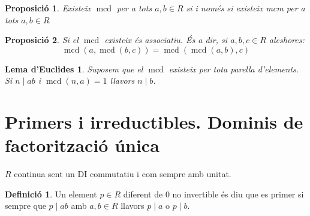 \documentclass[a4paper,11pt]{report}
\DeclareMathOperator{\mcd}{mcd}
\theoremstyle{theorem}
\newtheorem{proposicio}{\normalfont \sffamily\bfseries Proposició}[section]
\newtheorem*{lemaeuclid}{\normalfont\sffamily\bfseries Lema d'Euclides}
\theoremstyle{definition}
\newtheorem{definicio}{\normalfont\sffamily\bfseries Definició}[section]
\begin{document}
\begin{proposicio}
	Existeix $\mcd$ per a tots $a,b\in R$ si i només si existeix mcm per a tots $a,b\in R$
\end{proposicio}
\begin{proposicio}
	Si el $\mcd$ existeix és associatiu. És a dir, si $a,b,c\in R$ aleshores:$$\mcd(a,\mcd(b,c))=\mcd(\mcd(a,b),c)$$
\end{proposicio}
\begin{lemaeuclid}
	Suposem que el $\mcd$ existeix per tota parella d'elements. Si $n\mid ab$ i  $\mcd(n,a)=1$ llavors $n\mid b$.
\end{lemaeuclid}
\section{Primers i irreductibles. Dominis de factorització única}
$R$ continua sent un DI commutatiu i com sempre amb unitat.
\begin{definicio}
	Un element $p\in R$ diferent de 0 no invertible és diu que es primer si sempre que $p\mid ab$ amb $a,b\in R$ llavors $p\mid a$ o $p\mid b$.
\end{definicio}
\end{document}
